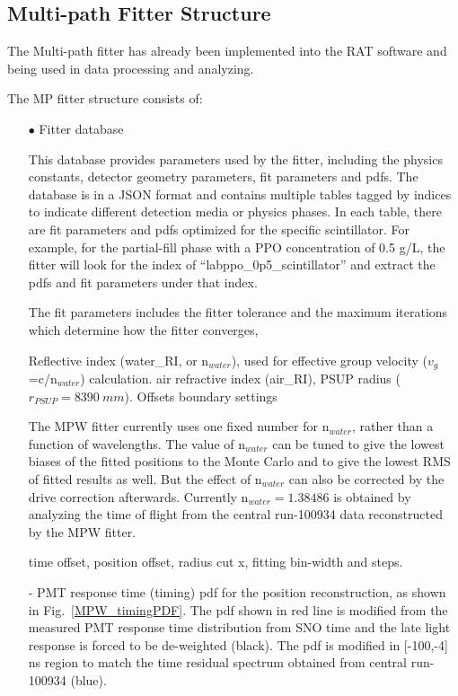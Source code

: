 \subsection{Multi-path Fitter Structure}
The Multi-path fitter has already been implemented into the RAT software and being used in data processing and analyzing.

The MP fitter structure consists of: 
\begin{itemize}
\item[$\bullet$] Fitter database

This database provides parameters used by the fitter, including the physics constants, detector geometry parameters, fit parameters and pdfs. The database is in a JSON format\cite{JSONwiki} and contains multiple tables tagged by indices to indicate different detection media or physics phases. In each table, there are fit parameters and pdfs optimized for the specific scintillator. For example, for the partial-fill phase with a PPO concentration of 0.5 g/L, the fitter will look for the index of ``labppo\_0p5\_scintillator'' and extract the pdfs and fit parameters under that index.  

The fit parameters includes the fitter tolerance and the maximum iterations which determine how the fitter converges, 

Reflective index (water\_RI, or n$_{water}$), used for effective group velocity ($v_g$ =c/n$_{water}$) calculation. 
air refractive index (air\_RI), PSUP radius ($r_{PSUP}=8390~mm$). Offsets
boundary settings


The MPW fitter currently uses one fixed number for n$_{water}$, rather than a function of wavelengths. The value of n$_{water}$ can be tuned to give the lowest biases of the fitted positions to the Monte Carlo and to give the lowest RMS of fitted results as well. But the effect of n$_{water}$ can also be corrected by the drive correction afterwards. Currently n$_{water}=1.38486$ is obtained by analyzing the time of flight from the  central run-100934 data reconstructed by the MPW fitter. 


time offset, position offset, radius cut x, fitting bin-width and steps.


- PMT response time (timing) pdf for the position reconstruction, as shown in Fig.~\ref{MPW_timingPDF}. The pdf shown in red line is modified from the measured PMT response time distribution from SNO time and the late light response is forced to be de-weighted (black). The pdf is modified in [-100,-4] ns region to match the time residual spectrum obtained from  central run-100934 (blue).


\end{itemize}
